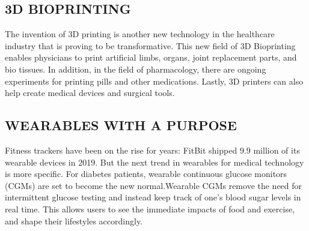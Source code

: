 \documentclass{article}
\begin{document}
\subsection{3D BIOPRINTING}
The invention of 3D printing is another new technology in the healthcare industry that is proving to be transformative. This new field of 3D Bioprinting enables physicians to print artificial limbs, organs, joint replacement parts, and bio tissues. In addition, in the field of pharmacology, there are ongoing experiments for printing pills and other medications. Lastly, 3D printers can also help create medical devices and surgical tools.
\subsection{ WEARABLES WITH A PURPOSE}
Fitness trackers have been on the rise for years: FitBit shipped 9.9 million of its wearable devices in 2019. But the next trend in wearables for medical technology is more specific. For diabetes patients, wearable continuous glucose monitors (CGMs) are set to become the new normal.Wearable CGMs remove the need for intermittent glucose testing and instead keep track of one’s blood sugar levels in real time. This allows users to see the immediate impacts of food and exercise, and shape their lifestyles accordingly. 
\end{document}
